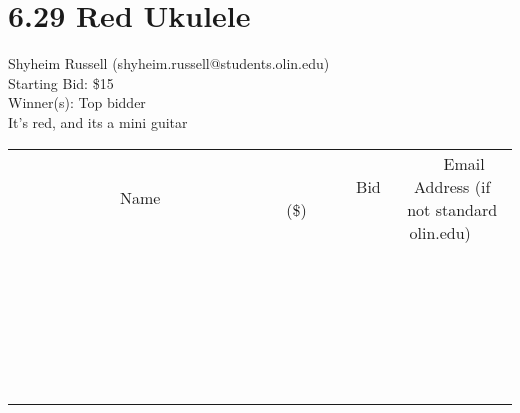 \documentclass[11pt]{article}
\begin{document}
\section*{6.29 Red Ukulele }
Shyheim Russell (shyheim.russell@students.olin.edu) \\
Starting Bid: \$15 \\
Winner(s): 
Top bidder \\
It's red, and its a mini guitar \\[6ex]
\begin{tabular}{c c c}
~~~~~~~~~~~~~Name~~~~~~~~~~~~~ & ~~~~~~~~~Bid (\$)~~~~~~~~~ & ~~~Email Address (if not standard olin.edu)~~~ \\
 & & \\
\hline
 & & \\
\hline
 & & \\
\hline
 & & \\
\hline
 & & \\
\hline
 & & \\
\hline
 & & \\
\hline
 & & \\
\hline
 & & \\
\hline
 & & \\
\hline
 & & \\
\hline
 & & \\
\hline
 & & \\
\hline
 & & \\
\hline
 & & \\
\hline
 & & \\
\hline
 & & \\
\hline
 & & \\
\hline
 & & \\
\hline
 & & \\
\hline
 & & \\
\hline
 & & \\
\hline
 & & \\
\hline
 & & \\
\hline
 & & \\
\hline
 & & \\
\hline
\end{tabular}
\clearpage
\end{document}
